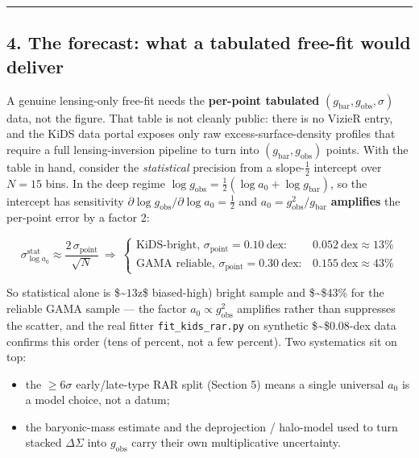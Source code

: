 \documentclass[
]{article}
\providecommand{\tightlist}{%
  \setlength{\itemsep}{0pt}\setlength{\parskip}{0pt}}
\begin{document}
\begin{center}\rule{0.5\linewidth}{0.5pt}\end{center}

\subsection{4. The forecast: what a tabulated free-fit would
deliver}\label{the-forecast-what-a-tabulated-free-fit-would-deliver}

A genuine lensing-only free-fit needs the \textbf{per-point tabulated}
\((g_\mathrm{bar}, g_\mathrm{obs}, \sigma)\) data, not the figure. That table
is not cleanly public: there is no VizieR entry, and the KiDS data
portal exposes only raw excess-surface-density profiles that require a
full lensing-inversion pipeline to turn into
\((g_\mathrm{bar}, g_\mathrm{obs})\) points. With the table in hand, consider
the \emph{statistical} precision from a slope-\(\tfrac12\) intercept
over \(N=15\) bins. In the deep regime
\(\log g_\mathrm{obs} = \tfrac12(\log a_0 + \log g_\mathrm{bar})\), so the
intercept has sensitivity
\(\partial\log g_\mathrm{obs}/\partial\log a_0 = \tfrac12\) and
\(a_0 = g_\mathrm{obs}^2/g_\mathrm{bar}\) \textbf{amplifies} the per-point
error by a factor 2:

\[
\sigma_{\log a_0}^\mathrm{stat} \approx \frac{2\,\sigma_\mathrm{point}}{\sqrt{N}}\ \Rightarrow\
\begin{cases}
\text{KiDS-bright, } \sigma_\mathrm{point}=0.10\ \text{dex}: & 0.052\ \text{dex} \approx 13\%\\[4pt]
\text{GAMA reliable, } \sigma_\mathrm{point}=0.30\ \text{dex}: & 0.155\ \text{dex} \approx 43\%
\end{cases}
\]

So statistical alone is \$\sim\(13%
\)z\$ biased-high) bright sample and \$\sim\$43\% for the reliable GAMA
sample --- the factor \(a_0\propto g_\mathrm{obs}^2\) amplifies rather than
suppresses the scatter, and the real fitter \texttt{fit\_kids\_rar.py}
on synthetic \$\sim\$0.08-dex data confirms this order (tens of percent,
not a few percent). Two systematics sit on top:

\begin{itemize}
\tightlist
\item
  the \(\ge6\sigma\) early/late-type RAR split (Section 5) means a
  single universal \(a_0\) is a model choice, not a datum;
\item
  the baryonic-mass estimate and the deprojection / halo-model used to
  turn stacked \(\Delta\Sigma\) into \(g_\mathrm{obs}\) carry their own
  multiplicative uncertainty.
\end{itemize}
\end{document}
